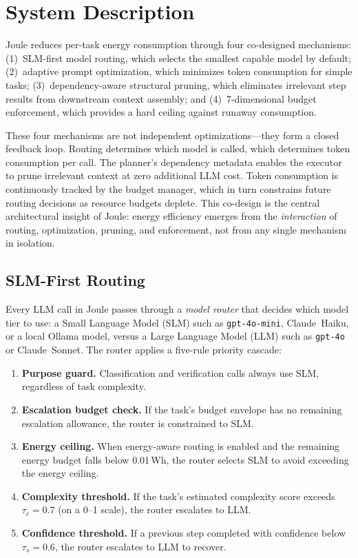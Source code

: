 \section{System Description}
\label{sec:system}

Joule reduces per-task energy consumption through four co-designed mechanisms: (1)~SLM-first model routing, which selects the smallest capable model by default; (2)~adaptive prompt optimization, which minimizes token consumption for simple tasks; (3)~dependency-aware structural pruning, which eliminates irrelevant step results from downstream context assembly; and (4)~7-dimensional budget enforcement, which provides a hard ceiling against runaway consumption.

These four mechanisms are not independent optimizations---they form a closed feedback loop. Routing determines which model is called, which determines token consumption per call. The planner's dependency metadata enables the executor to prune irrelevant context at zero additional LLM cost. Token consumption is continuously tracked by the budget manager, which in turn constrains future routing decisions as resource budgets deplete. This co-design is the central architectural insight of Joule: energy efficiency emerges from the \emph{interaction} of routing, optimization, pruning, and enforcement, not from any single mechanism in isolation.

\subsection{SLM-First Routing}
\label{sec:routing}

Every LLM call in Joule passes through a \emph{model router} that decides which model tier to use: a Small Language Model (SLM) such as \texttt{gpt-4o-mini}, Claude~Haiku, or a local Ollama model, versus a Large Language Model (LLM) such as \texttt{gpt-4o} or Claude~Sonnet. The router applies a five-rule priority cascade:

\begin{enumerate}[leftmargin=2em,itemsep=2pt]
  \item \textbf{Purpose guard.} Classification and verification calls always use SLM, regardless of task complexity.
  \item \textbf{Escalation budget check.} If the task's budget envelope has no remaining escalation allowance, the router is constrained to SLM.
  \item \textbf{Energy ceiling.} When energy-aware routing is enabled and the remaining energy budget falls below 0.01\,Wh, the router selects SLM to avoid exceeding the energy ceiling.
  \item \textbf{Complexity threshold.} If the task's estimated complexity score exceeds $\tau_c = 0.7$ (on a 0--1 scale), the router escalates to LLM.
  \item \textbf{Confidence threshold.} If a previous step completed with confidence below $\tau_s = 0.6$, the router escalates to LLM to recover.
\end{enumerate}

